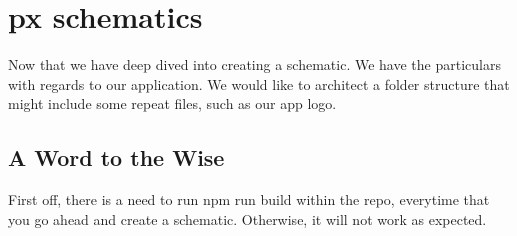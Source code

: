 \maketitle{}
\section{px schematics}

Now that we have deep dived into creating a schematic. We have the particulars
with regards to our application. We would like to architect a folder structure
that might include some repeat files, such as our app logo.

\subsection{A Word to the Wise}
First off, there is a need to run npm run build within the repo, everytime
that you go ahead and create a schematic. Otherwise, it will not work as
expected.
